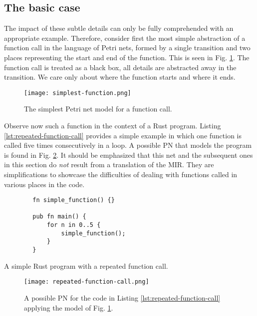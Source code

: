 \documentclass[../Thesis.tex]{subfiles}
\begin{document}
\subsection{The basic case}

The impact of these subtle details can only
be fully comprehended with an appropriate example.
Therefore, consider first the most simple abstraction of a function call in
the language of Petri nets, formed by a single transition and
two places representing the start and end of the function.
This is seen in Fig. \ref{fig:simplest-function}.
The function call is treated as a black box,
all details are abstracted away in the transition.
We care only about where the function starts and where it ends.

\begin{figure}[!htb]
    \centering
    \texttt{[image: simplest-function.png]}
    \caption{The simplest Petri net model for a function call.}
    \label{fig:simplest-function}
\end{figure}

Observe now such a function in the context of a Rust program.
Listing \ref{lst:repeated-function-call} provides a simple example
in which one function is called
five times consecutively in a  loop.
A possible \acrshort{PN} that models the program
is found in Fig. \ref{fig:repeated-function-call}.
It should be emphasized that
this net and the subsequent ones in this section
do \emph{not} result from a translation of the MIR.
They are simplifications to showcase the difficulties
of dealing with functions called in various places in the code.

\begin{listing}
    \begin{verbatim}
        fn simple_function() {}

        pub fn main() {
            for n in 0..5 {
                simple_function();
            }
        }
    \end{verbatim}
    \caption{A simple Rust program with a repeated function call.}
    \label{lst:repeated-function-call}
\end{listing}

\begin{figure}[!htb]
    \centering
    \texttt{[image: repeated-function-call.png]}
    \caption{A possible \acrshort{PN} for the code in Listing \ref{lst:repeated-function-call}
        applying the model of Fig. \ref{fig:simplest-function}.}
    \label{fig:repeated-function-call}
\end{figure}
\end{document}
